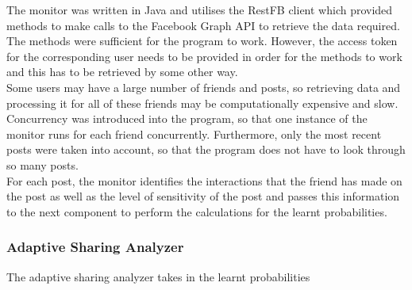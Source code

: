 \documentclass[a4paper,11pt]{article}
\begin{document}
The monitor was written in Java and utilises the RestFB client which provided methods to make calls to the Facebook Graph API to retrieve the data required. The methods were sufficient for the program to work. However, the access token for the corresponding user needs to be provided in order for the methods to work and this has to be retrieved by some other way.
\\
\indent Some users may have a large number of friends and posts, so retrieving data and processing it for all of these friends may be computationally expensive and slow. Concurrency was introduced into the program, so that one instance of the monitor runs for each friend concurrently. Furthermore, only the most recent posts were taken into account, so that the program does not have to look through so many posts. 
\\
\indent For each post, the monitor identifies the interactions that the friend has made on the post as well as the level of sensitivity of the post and passes this information to the next component to perform the calculations for the learnt probabilities.

\subsubsection{Adaptive Sharing Analyzer}

The adaptive sharing analyzer takes in the learnt probabilities 
\end{document}
